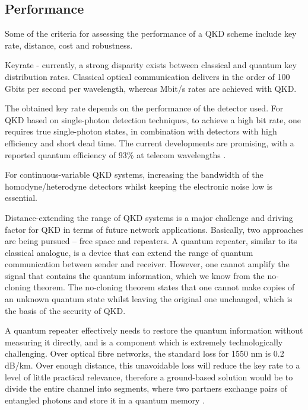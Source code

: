 \subsection{Performance}

Some of the criteria for assessing the performance of a QKD scheme include key rate, distance, cost and robustness.

Keyrate - currently, a strong disparity exists between classical and quantum key distribution rates. Classical optical communication delivers in the order of 100 Gbits per second per wavelength, whereas Mbit/s rates are achieved with QKD.

The obtained key rate depends on the performance of the detector used. For QKD based on single-photon detection techniques, to achieve a high bit rate, one requires true single-photon states, in combination with detectors with high efficiency and short dead time. The current developments are promising, with a reported quantum efficiency of $93\%$ at telecom wavelengths \cite{bib:marsili2013detecting}.

For continuous-variable QKD systems, increasing the bandwidth of the homodyne/heterodyne detectors whilst keeping the electronic noise low is essential.

Distance-extending the range of QKD systems is a major challenge and driving factor for QKD in terms of future network applications. Basically, two approaches are being pursued -- free space and repeaters.  A quantum repeater, similar to its classical analogue, is a device that can extend the range of quantum communication between sender and receiver. However, one cannot amplify the signal that contains the quantum information, which we know from the no-cloning theorem. The no-cloning theorem states that one cannot make copies of an unknown quantum state whilst leaving the original one unchanged, which is the basis of the security of QKD.

A quantum repeater effectively needs to restore the quantum information without measuring it directly, and is a component which is extremely technologically challenging. Over optical fibre networks, the standard loss for 1550 nm is 0.2 dB/km. Over enough distance, this unavoidable loss will reduce the key rate to a level of little practical relevance, therefore a ground-based solution would be to divide the entire channel into segments, where two partners exchange pairs of entangled photons and store it in a quantum memory \cite{bib:PhysRevLett.81.5932, bib:PhysRevA.59.169}.

